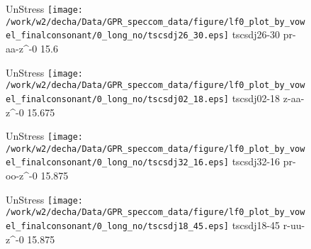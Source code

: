 \documentclass{article}
\begin{document}
\begin{figure}[t]
\begin{minipage}[b]{.24\textwidth}
UnStress
\centering
\texttt{[image: /work/w2/decha/Data/GPR\_speccom\_data/figure/lf0\_plot\_by\_vowel\_finalconsonant/0\_long\_no/tscsdj26\_30.eps]}
tscsdj26-30 pr-aa-z\textasciicircum-0 15.6
\end{minipage}
\begin{minipage}[b]{.24\textwidth}
UnStress
\centering
\texttt{[image: /work/w2/decha/Data/GPR\_speccom\_data/figure/lf0\_plot\_by\_vowel\_finalconsonant/0\_long\_no/tscsdj02\_18.eps]}
tscsdj02-18 z-aa-z\textasciicircum-0 15.675
\end{minipage}
\begin{minipage}[b]{.24\textwidth}
UnStress
\centering
\texttt{[image: /work/w2/decha/Data/GPR\_speccom\_data/figure/lf0\_plot\_by\_vowel\_finalconsonant/0\_long\_no/tscsdj32\_16.eps]}
tscsdj32-16 pr-oo-z\textasciicircum-0 15.875
\end{minipage}
\begin{minipage}[b]{.24\textwidth}
UnStress
\centering
\texttt{[image: /work/w2/decha/Data/GPR\_speccom\_data/figure/lf0\_plot\_by\_vowel\_finalconsonant/0\_long\_no/tscsdj18\_45.eps]}
tscsdj18-45 r-uu-z\textasciicircum-0 15.875
\end{minipage}
\end{figure}
\end{document}
